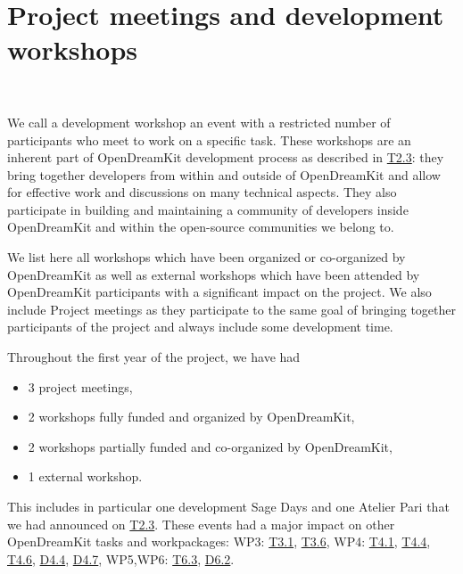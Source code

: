 \documentclass{../../Proposal/LaTeX-proposal/deliverablereport}
\author{Viviane Pons}
\begin{document}
\maketitle
\githubissuedescription


\section{Project meetings and development workshops}
~

We call a development workshop an event with a restricted number of participants
who meet to work on a specific task. These workshops are an inherent part
of OpenDreamKit development process as described in \href{https://github.com/OpenDreamKit/OpenDreamKit/issues/26}{T2.3}:
 they bring together
developers from within and outside of OpenDreamKit and allow for effective work
and discussions on many technical aspects. They also participate in building
and maintaining a community of developers inside OpenDreamKit and within the
open-source communities we belong to.

We list here all workshops which have been organized or co-organized by OpenDreamKit
as well as external workshops which have been attended by OpenDreamKit participants
with a significant impact on the project. We also include Project meetings as they
participate to the same goal of bringing together participants of the project and
always include some development time.

Throughout the first year of the project, we have had
\begin{itemize}
\item 3 project meetings,
\item 2 workshops fully funded and organized by OpenDreamKit,
\item 2 workshops partially funded and co-organized by OpenDreamKit,
\item 1 external workshop.
\end{itemize}
This includes in particular one development Sage Days and one Atelier
Pari that we had announced on \href{https://github.com/OpenDreamKit/OpenDreamKit/issues/26}{T2.3}.
 These events had a major impact on other OpenDreamKit tasks and workpackages: WP3: 
\href{https://github.com/OpenDreamKit/OpenDreamKit/issues/50}{T3.1},
\href{https://github.com/OpenDreamKit/OpenDreamKit/issues/55}{T3.6},
WP4:
\href{https://github.com/OpenDreamKit/OpenDreamKit/issues/69}{T4.1},
\href{https://github.com/OpenDreamKit/OpenDreamKit/issues/72}{T4.4},
\href{https://github.com/OpenDreamKit/OpenDreamKit/issues/74}{T4.6},
\href{https://github.com/OpenDreamKit/OpenDreamKit/issues/93}{D4.4},
\href{https://github.com/OpenDreamKit/OpenDreamKit/issues/96}{D4.7},
WP5,WP6:
\href{https://github.com/OpenDreamKit/OpenDreamKit/issues/125}{T6.3},
\href{https://github.com/OpenDreamKit/OpenDreamKit/issues/136}{D6.2}.
\end{document}

